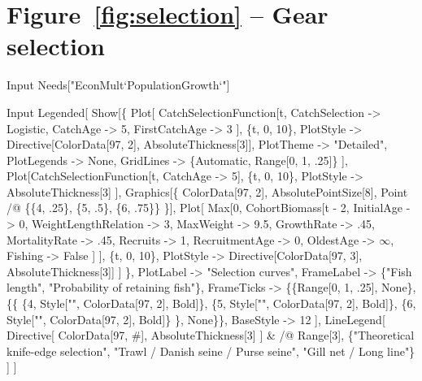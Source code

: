 \documentclass[11pt,fleqn]{book} %
\begin{document}
\section*{Figure~\ref{fig:selection} -- Gear selection }
\small{
\begin{mmaCell}[index=1]{Input}
  Needs["EconMult`PopulationGrowth`"]
\end{mmaCell}
\begin{mmaCell}{Input}
  Legended[
    Show[\{
      Plot[
        CatchSelectionFunction[t, 
          CatchSelection -> Logistic, 
          CatchAge       -> 5, 
          FirstCatchAge  -> 3
        ],
        \{t, 0, 10\}, 
        PlotStyle   -> Directive[ColorData[97, 2], AbsoluteThickness[3]], 
        PlotTheme   -> "Detailed", 
        PlotLegends -> None, 
        GridLines   -> \{Automatic, Range[0, 1, .25]\}
      ],
      Plot[CatchSelectionFunction[t, CatchAge -> 5], \{t, 0, 10\}, 
        PlotStyle -> AbsoluteThickness[3]
      ],
      Graphics[\{
        ColorData[97, 2], AbsolutePointSize[8], 
        Point /@ \{\{4, .25\}, \{5, .5\}, \{6, .75\}\}
      \}],
      Plot[
        Max[0, 
          CohortBiomass[t - 2,
            InitialAge           -> 0,
            WeightLengthRelation -> 3, 
            MaxWeight            -> 9.5, 
            GrowthRate           -> .45, 
            MortalityRate        -> .45, 
            Recruits             -> 1, 
            RecruitmentAge       -> 0, 
            OldestAge            -> \(\infty\), 
            Fishing              -> False
          ]
        ],
        \{t, 0, 10\}, 
        PlotStyle -> Directive[ColorData[97, 3], AbsoluteThickness[3]]
      ] \},
      PlotLabel -> "Selection curves", 
      FrameLabel -> \{"Fish length", "Probability of retaining fish"\},
      FrameTicks -> \{\{Range[0, 1, .25], None\}, \{\{
          \{4, Style["", ColorData[97, 2], Bold]\},
          \{5, Style["", ColorData[97, 2], Bold]\}, 
          \{6, Style["", ColorData[97, 2], Bold]\}
        \}, None\}\}, 
      BaseStyle -> 12
    ],
    LineLegend[
      Directive[
        ColorData[97, #], 
        AbsoluteThickness[3]
      ] & /@ Range[3],
      \{"Theoretical knife-edge selection", 
      "Trawl / Danish seine / Purse seine", 
      "Gill net / Long line"\}
    ]
  ]
\end{mmaCell}
}

\end{document}
